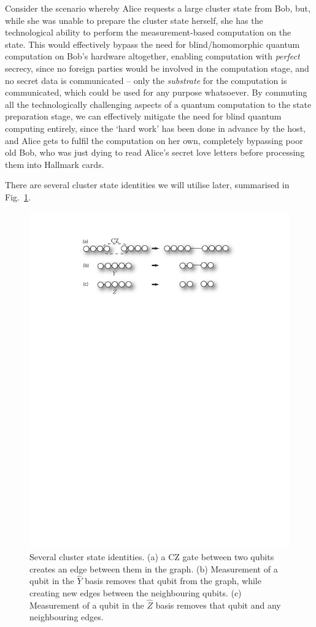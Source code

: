 \documentclass[aps,rmp,twocolumn,amsmath,amssymb,nofootinbib,superscriptaddress,longbibliography,floatfix]{revtex4-1}
\begin{document}
Consider the scenario whereby Alice requests a large cluster state from Bob, but, while she was unable to prepare the cluster state herself, she has the technological ability to perform the measurement-based computation on the state. This would effectively bypass the need for blind/homomorphic quantum computation on Bob's hardware altogether, enabling computation with \emph{perfect} secrecy, since no foreign parties would be involved in the computation stage, and no secret data is communicated -- only the \emph{substrate} for the computation is communicated, which could be used for any purpose whatsoever. By commuting all the technologically challenging aspects of a quantum computation to the state preparation stage, we can effectively mitigate the need for blind quantum computing entirely, since the `hard work' has been done in advance by the host, and Alice gets to fulfil the computation on her own, completely bypassing poor old Bob, who was just dying to read Alice's secret love letters before processing them into Hallmark cards.

There are several cluster state identities we will utilise later, summarised in Fig.~\ref{fig:cluster_ident}.

\begin{figure}[!htb]
\includegraphics[width=\columnwidth]{cluster_identities}
\caption{Several cluster state identities. (a) a CZ gate between two qubits creates an edge between them in the graph. (b) Measurement of a qubit in the $\hat{Y}$ basis removes that qubit from the graph, while creating new edges between the neighbouring qubits. (c) Measurement of a qubit in the $\hat{Z}$ basis removes that qubit and any neighbouring edges.} \label{fig:cluster_ident} 
\end{figure}
\end{document}
